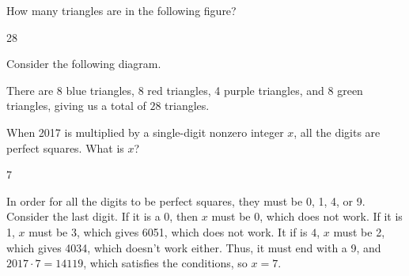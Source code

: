 \documentclass[11pt]{article}
\begin{document}
\begin{problem}
How many triangles are in the following figure?
    
    \begin{center}
    \end{center}
    
\end{problem}

\begin{answer}
28
\end{answer}

\begin{solution}
Consider the following diagram.
\begin{center}
    \end{center}
There are 8 blue triangles, 8 red triangles, 4 purple triangles, and 8 green triangles, giving us a total of $\boxed{28}$ triangles.
\end{solution}


\begin{problem}
When 2017 is multiplied by a single-digit nonzero integer $x$, all the digits are perfect squares. What is $x$?
\end{problem}

\begin{answer}
7
\end{answer}

\begin{solution}
In order for all the digits to be perfect squares, they must be 0, 1, 4, or 9. Consider the last digit. If it is a 0, then $x$ must be 0, which does not work. If it is 1, $x$ must be 3, which gives 6051, which does not work. It if is $4$, $x$ must be 2, which gives 4034, which doesn't work either. Thus, it must end with a 9, and $2017\cdot7=14119$, which satisfies the conditions, so $x=\boxed{7}$.
\end{solution}
\end{document}
